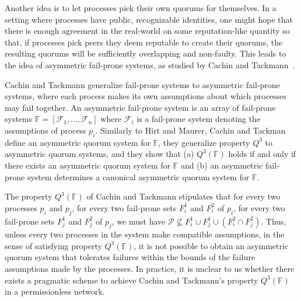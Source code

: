 \documentclass[11pt,letterpaper]{article}
\begin{document}
Another idea is to let processes pick their own quorums for themselves. In a setting where processes have public, recognizable identities, one might hope that there is enough agreement in the real-world on some reputation-like quantity so that, if processes pick peers they deem reputable to create their quorums, the resulting quorums will be sufficiently overlapping and non-faulty. This leads to the idea of asymmetric fail-prone systems, as studied by Cachin and Tackmann~\cite{cachinAsymmetricDistributedTrust2019}.

Cachin and Tackmann generalize fail-prone systems to asymmetric fail-prone systems, where each process makes its own assumptions about which processes may fail together.
An asymmetric fail-prone system is an array of fail-prone systems $\mathbb{F}=\left[\mathcal{F}_1,...,\mathcal{F}_n\right]$ where $\mathcal{F}_i$ is a fail-prone system denoting the assumptions of process $p_i$.  Similarly to Hirt and Maurer, Cachin and Tackman define an asymmetric quorum system for $\mathbb{F}$, they generalize property $Q^3$ to asymmetric quorum systems, and they show that (a) $Q^3(\mathbb{F})$ holds if and only if there exists an asymmetric quorum system for $\mathbb{F}$ and (b) an asymmetric fail-prone system determines a canonical asymmetric quorum system for $\mathbb{F}$.


The property $Q^3(\mathbb{F})$ of Cachin and Tackmann stipulates that for every two processes $p_i$ and $p_j$, for every two fail-prone sets $F_i^1$ and $F_i^2$ of $p_i$, for every two fail-prone sets $F_j^1$ and $F_j^2$ of $p_j$, we must have $\mathcal{P}\not\subseteq F_i^1\cup F_j^1\cup \left(F_i^2\cap F_j^2\right)$. Thus, unless every two processes in the system make compatible assumptions, in the sense of satisfying property $Q^3(\mathbb{F})$, it is not possible to obtain an asymmetric quorum system that tolerates failures within the bounds of the failure assumptions made by the processes. In practice, it is unclear to us whether there exists a pragmatic scheme to achieve Cachin and Tackmann's property $Q^3(\mathbb{F})$ in a permissionless network.
\printbibliography

\end{document}
